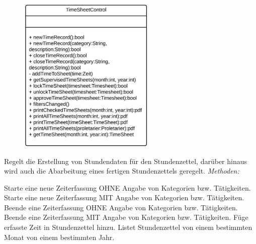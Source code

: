 \begin{itemize}
\begin{itemize}
                    \newpage
                    \begin{figure}[htb]
                    \centering
                    \includegraphics[width=6.5cm]{Diagramms/class/singleclass/ControlTimeSheet.pdf}
                    \end{figure}
                    \newline
                        Regelt die Erstellung von Stundendaten für den Stundenzettel, darüber hinaus wird auch die Abarbeitung eines fertigen Stundenzettels geregelt.
                                                           \newline
                    \emph{Methoden:}
                        \begin{itemize}
                             Starte eine neue Zeiterfassung OHNE Angabe von Kategorien bzw. Tätigkeiten.
                             Starte eine neue Zeiterfassung MIT Angabe von Kategorien bzw. Tätigkeiten.
                             Beende eine Zeiterfassung OHNE Angabe von Kategorien bzw. Tätigkeiten.
                             Beende eine Zeiterfassung MIT Angabe von Kategorien bzw. Tätigkeiten.
                             Füge erfasste Zeit in Stundenzettel hinzu.
                             Listet Stundenzettel von einem bestimmten Monat von einem bestimmten Jahr.

\end{itemize}
\end{itemize}
\end{itemize}
